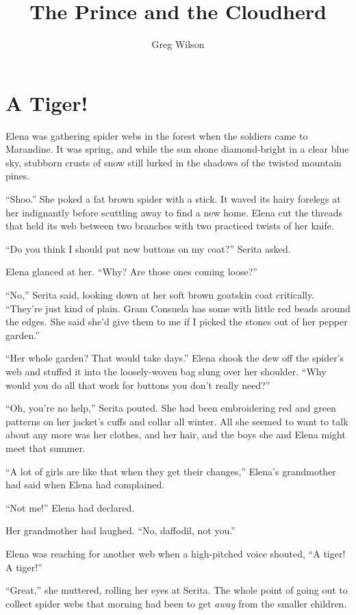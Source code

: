 \documentclass[10pt]{book}
\title{The Prince and the Cloudherd}
\author{Greg Wilson}
\begin{document}
\onehalfspacing
\maketitle

\chapter{A Tiger!}

Elena was gathering spider webs in the forest when the soldiers came to Marandine. It was spring, and while the sun shone diamond-bright in a clear blue sky, stubborn crusts of snow still lurked in the shadows of the twisted mountain pines.

``Shoo.'' She poked a fat brown spider with a stick. It waved its hairy forelegs at her indignantly before scuttling away to find a new home. Elena cut the threads that held its web between two branches with two practiced twists of her knife.

``Do you think I should put new buttons on my coat?'' Serita asked.

Elena glanced at her. ``Why? Are those ones coming loose?''

``No,'' Serita said, looking down at her soft brown goatskin coat critically. ``They're just kind of plain. Gram Consuela has some with little red beads around the edges. She said she'd give them to me if I picked the stones out of her pepper garden.''

``Her whole garden? That would take days.'' Elena shook the dew off the spider's web and stuffed it into the loosely-woven bag slung over her shoulder. ``Why would you do all that work for buttons you don't really need?''

``Oh, you're no help,'' Serita pouted. She had been embroidering red and green patterns on her jacket's cuffs and collar all winter. All she seemed to want to talk about any more was her clothes, and her hair, and the boys she and Elena might meet that summer.

``A lot of girls are like that when they get their changes,'' Elena's grandmother had said when Elena had complained.

``Not me!'' Elena had declared.

Her grandmother had laughed. ``No, daffodil, not you.''

Elena was reaching for another web when a high-pitched voice shouted, ``A tiger!  A tiger!''

``Great,'' she muttered, rolling her eyes at Serita. The whole point of going out to collect spider webs that morning had been to get \emph{away} from the smaller children.
\end{document}
